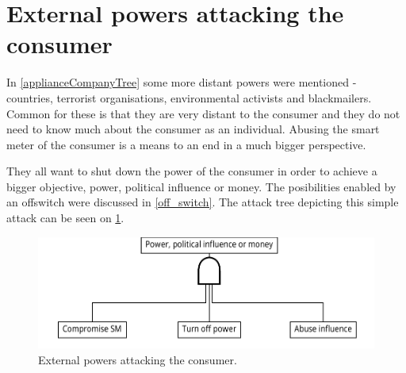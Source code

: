 
\section{External powers attacking the consumer}
In \cref{applianceCompanyTree} some more distant powers were mentioned - countries, terrorist organisations, environmental activists and blackmailers.
Common for these is that they are very distant to the consumer and they do not need to know much about the consumer as an individual.
Abusing the smart meter of the consumer is a means to an end in a much bigger perspective.

They all want to shut down the power of the consumer in order to achieve a bigger objective, power, political influence or money.
The posibilities enabled by an offswitch were discussed in \cref{off_switch}.
The attack tree depicting this simple attack can be seen on \cref{fig:attack_trees:external}.

\begin{figure}[H]
  \centering
	\includegraphics[width=.75\textwidth]{figures/graphviz/offswitch.pdf}
	\caption{External powers attacking the consumer.}
	\label{fig:attack_trees:external}
\end{figure}